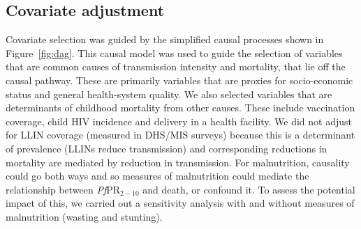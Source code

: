 \subsection*{Covariate adjustment}

Covariate selection was guided by the simplified causal processes shown in Figure~\ref{fig:dag}. This causal model was used to guide the selection of variables that are common causes of transmission intensity and mortality, that lie off the causal pathway. These are primarily variables that are proxies for socio-economic status and general health-system quality. We also selected variables that are determinants of childhood mortality from other causes. These include vaccination coverage, child HIV incidence and delivery in a health facility. We did not adjust for LLIN coverage (measured in DHS/MIS surveys) because this is a determinant of prevalence (LLINs reduce transmission) and corresponding reductions in mortality are mediated by reduction in transmission. For malnutrition, causality could go both ways and so measures of malnutrition could mediate the relationship between \textit{Pf}PR$_{2-10}$ and death, or confound it. To assess the potential impact of this, we carried out a sensitivity analysis with and without measures of malnutrition (wasting and stunting).

